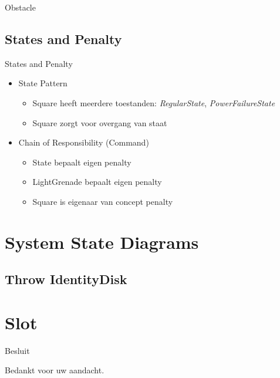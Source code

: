 \documentclass[t]{beamer}
\begin{document}
\begin{frame}{Obstacle}
\begin{center}
\end{center}
\end{frame}

\subsection{States and Penalty}

\begin{frame}{States and Penalty}
\begin{itemize}
	\item State Pattern
	\begin{itemize}
		\item Square heeft meerdere toestanden: \textit{RegularState}, \textit{PowerFailureState}
		\item Square zorgt voor overgang van staat
	\end{itemize}
	\item Chain of Responsibility (Command)
	\begin{itemize}
		\item State bepaalt eigen penalty
		\item LightGrenade bepaalt eigen penalty
		\item Square is eigenaar van concept penalty
	\end{itemize}
\end{itemize}
\end{frame}


\section{System State Diagrams}

\subsection{Throw IdentityDisk}
\begin{frame}
\begin{center}

\end{center}
\end{frame}


\section{Slot}
\begin{frame}{Besluit}
\vspace{0.8in}
\begin{center}
Bedankt voor uw aandacht.
\end{center}
\end{frame}
\end{document}
